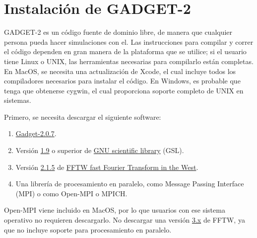 \documentclass[a4paper,openright,12pt]{book}
\begin{document}
 

\appendix 

\chapter{Instalación de GADGET-2}\label{Apend.A}
GADGET-2 es un código fuente de dominio libre, de manera que cualquier persona pueda hacer simulaciones con el. Las instrucciones para compilar y correr el código dependen en gran manera de la plataforma que se utilice; si el usuario tiene Linux o UNIX, las herramientas necesarias para compilarlo están completas. En MacOS, se necesita una actualización de \textsf{Xcode}, el cual incluye todos los compiladores necesarios para instalar el código. En Windows, es probable que tenga que obtenerse \textsf{cygwin}, el cual proporciona soporte completo de UNIX en sistemas.

Primero, se necesita descargar el siguiente software:
\begin{enumerate}
\item \underline{Gadget-2.0.7}.
\item Versión \underline{1.9} o superior de \underline{GNU scientific library} (GSL).
\item Versión \underline{2.1.5} de \underline{FFTW fast Fourier Transform in the West}.
\item Una librería de procesamiento en paralelo, como Message Passing Interface (MPI) o como \textsf{Open-MPI} o \textsf{MPICH}.
\end{enumerate}

\textsf{Open-MPI} viene incluido en MacOS, por lo que usuarios con ese sistema operativo no requieren descargarlo. No descargar una versión \underline{3.x} de FFTW, ya que no incluye soporte para procesamiento en paralelo.
\end{document}
